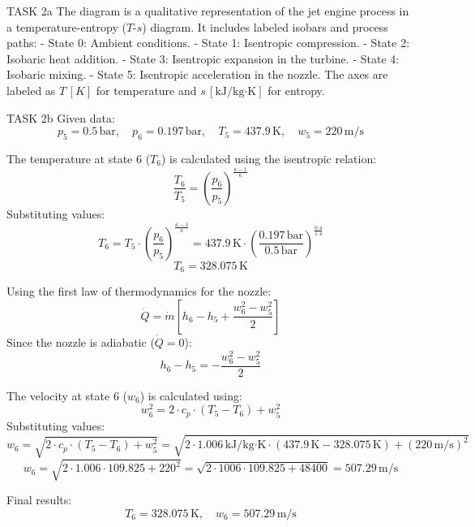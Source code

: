 TASK 2a  
The diagram is a qualitative representation of the jet engine process in a temperature-entropy (\( T \)-\( s \)) diagram. It includes labeled isobars and process paths:  
- State 0: Ambient conditions.  
- State 1: Isentropic compression.  
- State 2: Isobaric heat addition.  
- State 3: Isentropic expansion in the turbine.  
- State 4: Isobaric mixing.  
- State 5: Isentropic acceleration in the nozzle.  
The axes are labeled as \( T \, [K] \) for temperature and \( s \, [\text{kJ}/\text{kg·K}] \) for entropy.  

TASK 2b  
Given data:  
\[
p_5 = 0.5 \, \text{bar}, \quad p_6 = 0.197 \, \text{bar}, \quad T_5 = 437.9 \, \text{K}, \quad w_5 = 220 \, \text{m/s}
\]  

The temperature at state 6 (\( T_6 \)) is calculated using the isentropic relation:  
\[
\frac{T_6}{T_5} = \left( \frac{p_6}{p_5} \right)^{\frac{\kappa - 1}{\kappa}}  
\]  
Substituting values:  
\[
T_6 = T_5 \cdot \left( \frac{p_6}{p_5} \right)^{\frac{\kappa - 1}{\kappa}} = 437.9 \, \text{K} \cdot \left( \frac{0.197 \, \text{bar}}{0.5 \, \text{bar}} \right)^{\frac{0.4}{1.4}}  
\]  
\[
T_6 = 328.075 \, \text{K}  
\]  

Using the first law of thermodynamics for the nozzle:  
\[
\dot{Q} = \dot{m} \left[ h_6 - h_5 + \frac{w_6^2 - w_5^2}{2} \right]  
\]  
Since the nozzle is adiabatic (\( \dot{Q} = 0 \)):  
\[
h_6 - h_5 = -\frac{w_6^2 - w_5^2}{2}  
\]  

The velocity at state 6 (\( w_6 \)) is calculated using:  
\[
w_6^2 = 2 \cdot c_p \cdot (T_5 - T_6) + w_5^2  
\]  
Substituting values:  
\[
w_6 = \sqrt{2 \cdot c_p \cdot (T_5 - T_6) + w_5^2} = \sqrt{2 \cdot 1.006 \, \text{kJ}/\text{kg·K} \cdot (437.9 \, \text{K} - 328.075 \, \text{K}) + (220 \, \text{m/s})^2}  
\]  
\[
w_6 = \sqrt{2 \cdot 1.006 \cdot 109.825 + 220^2} = \sqrt{2 \cdot 1006 \cdot 109.825 + 48400} = 507.29 \, \text{m/s}  
\]  

Final results:  
\[
T_6 = 328.075 \, \text{K}, \quad w_6 = 507.29 \, \text{m/s}  
\]